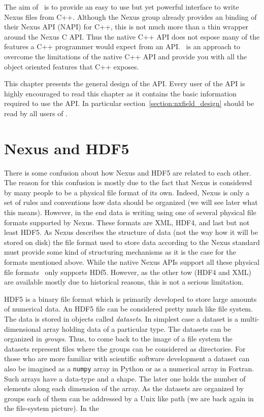 
The aim of \pninx\ is to provide an easy to use but yet powerful interface
to write Nexus files from C++. Although the Nexus group already provides 
an binding of their Nexus API (NAPI) for C++, this is not much more than a 
thin wrapper around the Nexus C API. Thus the native C++ API does not espose
many of the features a C++ programmer would expect from an API. 
\pninx\ is an approach to overcome the limitations of the native C++ API 
and provide you with all the object oriented features that C++ exposes.

This chapter presents the general design of the API. Every user of the API is
highly encouraged to read this chapter as it contains the basic information 
required to use the API. In particular 
section~\ref{section:nxfield_design} should be read by all users of \pninx. 

\section{Nexus and HDF5}

There is some confusion about how Nexus and HDF5 are related to each other. 
The reason for this confusion is mostly due to the fact that Nexus is considered
by many people to be a physical file format of its own. Indeed, Nexus is only a
set of rules and conventions how data should be organized (we will see later
what this means). However, in the end data is writing using one of several
physical file formats supported by Nexus. These formats are XML, HDF4, and last
but not least HDF5. As Nexus describes the structure of data (not the way how it
will be stored on disk) the file format used to store data according to the
Nexus standard must provide some kind of structuring mechanisms as it is the
case for the formats mentioned above. 
While the native Nexus APIs support all these physical file formats \pninx\
only supports HDf5. However, as the other tow (HDF4 and XML) are available
mostly due to historical reasons, this is not a serious limitation. 

HDF5 is a binary file format which is primarily developed  to store large
amounts of numerical data. 
An HDF5 file can be considered pretty much like file system. The data is stored 
in objects called {\em datasets}. In simplest case a dataset is a
multi-dimensional array holding data of a particular type. The datasets can be 
organized in {\em groups}. Thus, to come back to the image of a file system 
the datasets represent files where the groups can be considered as directories.
For those who are more familiar with scientific software development a dataset
can also be imagined as a {\tt numpy} array in Python or as a numerical array 
in Fortran. Such arrays have a data-type and a shape. The later one holds the 
number of elements along each dimension of the array.
As the datasets are organized by groups each of them can be addressed by a Unix
like path (we are back again in the file-system picture). In the 

